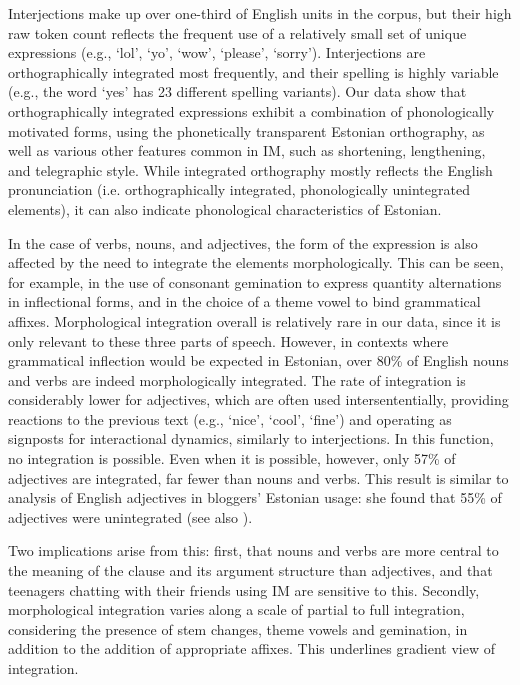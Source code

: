 \documentclass[output=paper]{langscibook}
\begin{document}
Interjections make up over one-third of English units in the corpus, but their high raw token count reflects the frequent use of a relatively small set of unique expressions (e.g., ‘lol’, ‘yo’, ‘wow’, ‘please’, ‘sorry’). Interjections are orthographically integrated most frequently, and their spelling is highly variable (e.g., the word ‘yes’ has 23 different spelling variants). Our data show that orthographically integrated expressions exhibit a combination of phonologically motivated forms, using the phonetically transparent Estonian orthography, as well as various other features common in IM, such as shortening, lengthening, and telegraphic style. While integrated orthography mostly reflects the English pronunciation (i.e. orthographically integrated, phonologically unintegrated elements), it can also indicate phonological characteristics of Estonian.

In the case of verbs, nouns, and adjectives, the form of the expression is also affected by the need to integrate the elements morphologically. This can be seen, for example, in the use of consonant gemination to express quantity alternations in inflectional forms, and in the choice of a theme vowel to bind grammatical affixes. Morphological integration overall is relatively rare in our data, since it is only relevant to these three parts of speech. However, in contexts where grammatical inflection would be expected in Estonian, over 80\% of English nouns and verbs are indeed morphologically integrated. The rate of integration is considerably lower for adjectives, which are often used intersententially, providing reactions to the previous text (e.g., ‘nice’, ‘cool’, ‘fine’) and operating as signposts for interactional dynamics, similarly to interjections. In this function, no integration is possible. Even when it is possible, however, only 57\% of adjectives are integrated, far fewer than nouns and verbs. This result is similar to  analysis of English adjectives in bloggers’ Estonian usage: she found that 55\% of adjectives were unintegrated (see also \citealt{BahtinaEtAl2021}).

Two implications arise from this: first, that nouns and verbs are more central to the meaning of the clause and its argument structure than adjectives, and that teenagers chatting with their friends using IM are sensitive to this. Secondly, morphological integration varies along a scale of partial to full integration, considering the presence of stem changes, theme vowels and gemination, in addition to the addition of appropriate affixes. This underlines  gradient view of integration.
\end{document}
